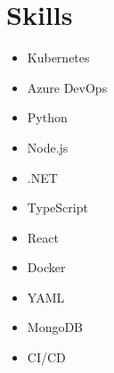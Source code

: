 \section*{Skills}
\begin{itemize}
    \item Kubernetes
    \item Azure DevOps
    \item Python
    \item Node.js
    \item .NET
    \item TypeScript
    \item React
    \item Docker
    \item YAML
    \item MongoDB
    \item CI/CD
\end{itemize}

